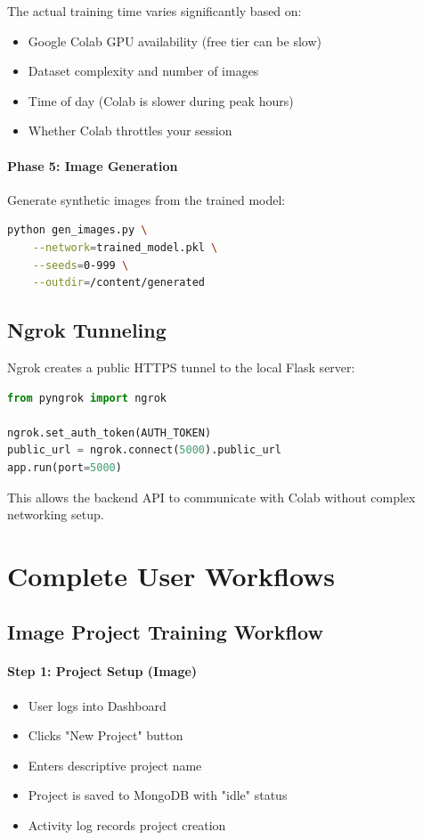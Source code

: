 \documentclass[11pt,a4paper]{article}
\begin{document}
The actual training time varies significantly based on:
\begin{itemize}[noitemsep]
    \item Google Colab GPU availability (free tier can be slow)
    \item Dataset complexity and number of images
    \item Time of day (Colab is slower during peak hours)
    \item Whether Colab throttles your session
\end{itemize}

\paragraph{Phase 5: Image Generation} Generate synthetic images from the trained model:
\begin{lstlisting}[language=bash]
python gen_images.py \
    --network=trained_model.pkl \
    --seeds=0-999 \
    --outdir=/content/generated
\end{lstlisting}

\subsection{Ngrok Tunneling}

Ngrok creates a public HTTPS tunnel to the local Flask server:
\begin{lstlisting}[language=Python]
from pyngrok import ngrok

ngrok.set_auth_token(AUTH_TOKEN)
public_url = ngrok.connect(5000).public_url
app.run(port=5000)
\end{lstlisting}

This allows the backend API to communicate with Colab without complex networking setup.

\section{Complete User Workflows}

\subsection{Image Project Training Workflow}

\paragraph{Step 1: Project Setup (Image)}
\begin{itemize}[noitemsep]
    \item User logs into Dashboard
    \item Clicks "New Project" button
    \item Enters descriptive project name
    \item Project is saved to MongoDB with "idle" status
    \item Activity log records project creation
\end{itemize}
\end{document}
